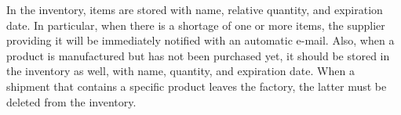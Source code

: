 In the inventory, items are stored with name, relative quantity, and expiration date. In particular, when there is a shortage of one or more items, the supplier
providing it will be immediately notified with an automatic e-mail. Also, when a product is manufactured but has not been purchased yet, it should be stored in
the inventory as well, with name, quantity, and expiration date. When a shipment that contains a specific product leaves the factory, the latter must be deleted
from the inventory.

%
%
%
%
